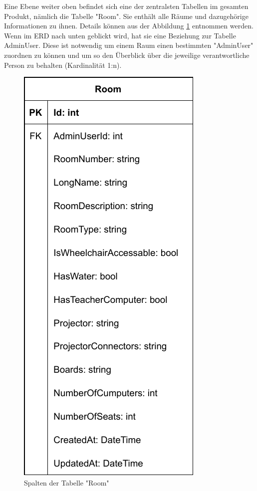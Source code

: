 \pagebreak


Eine Ebene weiter oben befindet sich eine der zentralsten Tabellen im gesamten Produkt, nämlich die Tabelle "Room". Sie enthält alle Räume und dazugehörige Informationen zu ihnen. Details können aus der Abbildung \ref{fig:RoomTableColls} entnommen werden. Wenn im ERD nach unten geblickt wird, hat sie eine Beziehung zur Tabelle AdminUser. Diese ist notwendig um einem Raum einen bestimmten "AdminUser" zuordnen zu können und um so den Überblick über die jeweilige verantwortliche Person zu behalten (Kardinalität 1:n).

\begin{figure}[H]
    \centering
    \includegraphics{media/MariaDB/Room.svg.pdf}
    \caption{Spalten der Tabelle "Room"}
    \label{fig:RoomTableColls}
\end{figure}

